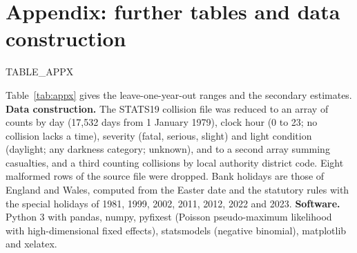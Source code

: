 \documentclass[11pt,a4paper]{article}
\begin{document}
\appendix
\section{Appendix: further tables and data construction}
{{TABLE_APPX}}

Table~\ref{tab:appx} gives the leave-one-year-out ranges and the secondary estimates. \textbf{Data construction.} The STATS19 collision file was reduced to an array of counts by day (17,532 days from 1 January 1979), clock hour (0 to 23; no collision lacks a time), severity (fatal, serious, slight) and light condition (daylight; any darkness category; unknown), and to a second array summing casualties, and a third counting collisions by local authority district code. Eight malformed rows of the source file were dropped. Bank holidays are those of England and Wales, computed from the Easter date and the statutory rules with the special holidays of 1981, 1999, 2002, 2011, 2012, 2022 and 2023. \textbf{Software.} Python 3 with pandas, numpy, pyfixest (Poisson pseudo-maximum likelihood with high-dimensional fixed effects), statsmodels (negative binomial), matplotlib and xelatex.
\end{document}
